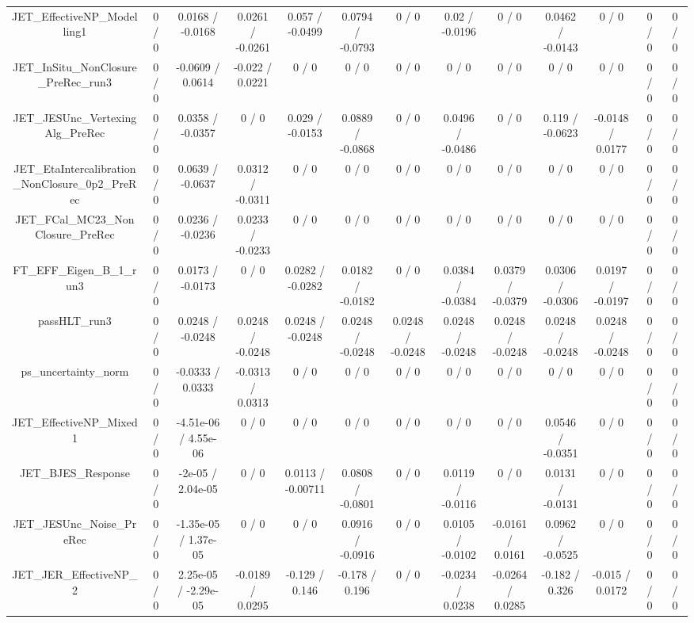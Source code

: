 \documentclass[10pt]{article}
\begin{document}
\begin{table}[htbp]
\begin{center}
\begin{tabular}{|c|c|c|c|c|c|c|c|c|c|c|c|c|}
  JET_EffectiveNP_Modelling1 & 0 / 0 & 0.0168 / -0.0168 & 0.0261 / -0.0261 & 0.057 / -0.0499 & 0.0794 / -0.0793 & 0 / 0 & 0.02 / -0.0196 & 0 / 0 & 0.0462 / -0.0143 & 0 / 0 & 0 / 0 & 0 / 0 \\ 
  JET_InSitu_NonClosure_PreRec_run3 & 0 / 0 & -0.0609 / 0.0614 & -0.022 / 0.0221 & 0 / 0 & 0 / 0 & 0 / 0 & 0 / 0 & 0 / 0 & 0 / 0 & 0 / 0 & 0 / 0 & 0 / 0 \\ 
  JET_JESUnc_VertexingAlg_PreRec & 0 / 0 & 0.0358 / -0.0357 & 0 / 0 & 0.029 / -0.0153 & 0.0889 / -0.0868 & 0 / 0 & 0.0496 / -0.0486 & 0 / 0 & 0.119 / -0.0623 & -0.0148 / 0.0177 & 0 / 0 & 0 / 0 \\ 
  JET_EtaIntercalibration_NonClosure_0p2_PreRec & 0 / 0 & 0.0639 / -0.0637 & 0.0312 / -0.0311 & 0 / 0 & 0 / 0 & 0 / 0 & 0 / 0 & 0 / 0 & 0 / 0 & 0 / 0 & 0 / 0 & 0 / 0 \\ 
  JET_FCal_MC23_NonClosure_PreRec & 0 / 0 & 0.0236 / -0.0236 & 0.0233 / -0.0233 & 0 / 0 & 0 / 0 & 0 / 0 & 0 / 0 & 0 / 0 & 0 / 0 & 0 / 0 & 0 / 0 & 0 / 0 \\ 
  FT_EFF_Eigen_B_1_run3 & 0 / 0 & 0.0173 / -0.0173 & 0 / 0 & 0.0282 / -0.0282 & 0.0182 / -0.0182 & 0 / 0 & 0.0384 / -0.0384 & 0.0379 / -0.0379 & 0.0306 / -0.0306 & 0.0197 / -0.0197 & 0 / 0 & 0 / 0 \\ 
  passHLT_run3 & 0 / 0 & 0.0248 / -0.0248 & 0.0248 / -0.0248 & 0.0248 / -0.0248 & 0.0248 / -0.0248 & 0.0248 / -0.0248 & 0.0248 / -0.0248 & 0.0248 / -0.0248 & 0.0248 / -0.0248 & 0.0248 / -0.0248 & 0 / 0 & 0 / 0 \\ 
  ps_uncertainty_norm & 0 / 0 & -0.0333 / 0.0333 & -0.0313 / 0.0313 & 0 / 0 & 0 / 0 & 0 / 0 & 0 / 0 & 0 / 0 & 0 / 0 & 0 / 0 & 0 / 0 & 0 / 0 \\ 
  JET_EffectiveNP_Mixed1 & 0 / 0 & -4.51e-06 / 4.55e-06 & 0 / 0 & 0 / 0 & 0 / 0 & 0 / 0 & 0 / 0 & 0 / 0 & 0.0546 / -0.0351 & 0 / 0 & 0 / 0 & 0 / 0 \\ 
  JET_BJES_Response & 0 / 0 & -2e-05 / 2.04e-05 & 0 / 0 & 0.0113 / -0.00711 & 0.0808 / -0.0801 & 0 / 0 & 0.0119 / -0.0116 & 0 / 0 & 0.0131 / -0.0131 & 0 / 0 & 0 / 0 & 0 / 0 \\ 
  JET_JESUnc_Noise_PreRec & 0 / 0 & -1.35e-05 / 1.37e-05 & 0 / 0 & 0 / 0 & 0.0916 / -0.0916 & 0 / 0 & 0.0105 / -0.0102 & -0.0161 / 0.0161 & 0.0962 / -0.0525 & 0 / 0 & 0 / 0 & 0 / 0 \\ 
  JET_JER_EffectiveNP_2 & 0 / 0 & 2.25e-05 / -2.29e-05 & -0.0189 / 0.0295 & -0.129 / 0.146 & -0.178 / 0.196 & 0 / 0 & -0.0234 / 0.0238 & -0.0264 / 0.0285 & -0.182 / 0.326 & -0.015 / 0.0172 & 0 / 0 & 0 / 0 \\ 

\end{tabular}
\end{center}
\end{table}
\end{document}
